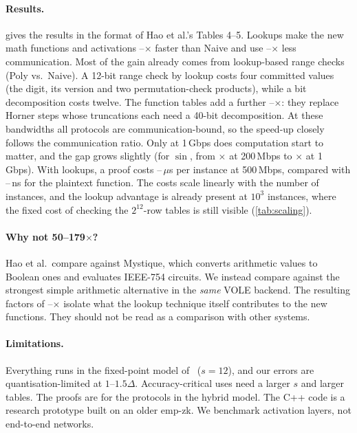 \documentclass[10pt,twocolumn]{article}
\theoremstyle{remark}
\newcommand{\ulp}{\Delta}
\begin{document}
\paragraph{Results.}  gives the results in the format of Hao et al.'s Tables 4--5.
Lookups make the new math functions and activations \SpeedMin--\SpeedMax$\times$ faster than
\textsf{Naive} and use \CommMin--\CommMax$\times$ less communication. Most of the gain already comes
from lookup-based range checks (\textsf{Poly} vs.\ \textsf{Naive}). A 12-bit range check by lookup
costs four committed values (the digit, its version and two permutation-check products), while a
bit decomposition costs twelve. The function tables add a further
\PolySpeedMin--\PolySpeedMax$\times$: they replace Horner steps whose truncations each need a
40-bit decomposition. At these bandwidths all protocols are communication-bound, so the speed-up
closely follows the communication ratio. Only at 1\,Gbps does computation start to matter, and the
gap grows slightly (for $\sin$, from \SinGapLow$\times$ at 200\,Mbps to \SinGapHigh$\times$ at 1\,Gbps). With
lookups, a proof costs \OverMin--\OverMax\,$\mu$s per instance at 500\,Mbps, compared with
\PlainMin--\PlainMax\,ns for the plaintext function. The costs scale linearly with the number of instances, and
the lookup advantage is already present at $10^3$ instances, where the fixed cost of checking the
$2^{12}$-row tables is still visible (\cref{tab:scaling}).

\paragraph{Why not 50--179$\times$?} Hao et al.\ compare against Mystique, which converts
arithmetic values to Boolean ones and evaluates IEEE-754 circuits. We instead compare against the
strongest simple arithmetic alternative in the \emph{same} VOLE backend. The resulting factors of
\SpeedMin--\SpeedMax$\times$ isolate what the lookup technique itself contributes to the new
functions. They should not be read as a comparison with other systems.



\paragraph{Limitations.} Everything runs in the fixed-point model of~\cite{hao2024scalable}
($s=12$), and our errors are quantisation-limited at $1$--$1.5\ulp$. Accuracy-critical uses need a
larger $s$ and larger tables. The proofs are for the protocols in the hybrid model. The C++ code is a
research prototype built on an older emp-zk. We benchmark activation layers, not end-to-end
networks.
\end{document}

